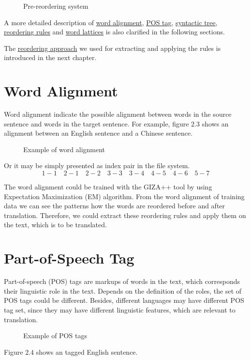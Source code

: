 \begin{figure}[H]
\centering

\caption{Pre-reordering system}
\end{figure}

A more detailed description of \hyperref[ch:Foundations:sec:Alignment]{word alignment}, \hyperref[ch:Foundations:sec:PosTag]{POS tag}, \hyperref[ch:Foundations:sec:SyntacticTree]{syntactic tree},
\hyperref[ch:Foundations:sec:types]{reordering rules} and 
\hyperref[ch:Foundations:sec:Lattices]{word lattices} is also clarified in the following sections.

The \hyperref[ch:ReorderingApproach]{reordering approach} we used for extracting and applying the rules is introduced in the next chapter.

\section{Word Alignment}
\label{ch:Foundations:sec:Alignment}

Word alignment indicate the possible alignment between words in the source sentence and words in the target sentence. For example, figure $2.3$ shows an alignment between an English sentence and a Chinese sentence.

\begin{figure}[H]
\centering

\caption{Example of word alignment}
\end{figure}

Or it may be simply presented as index pair in the file system.
$$1-1\quad 2-1\quad 2-2\quad 3-3\quad 3-4\quad 4-5\quad 4-6\quad 5-7$$

The word alignment could be trained with the GIZA++ tool by using Expectation Maximization (EM) algorithm. From the word alignment of training data we can see the patterns how the words are reordered before and after translation. Therefore, we could extract these reordering rules and apply them on the text, which is to be translated.

\section{Part-of-Speech Tag}

Part-of-speech (POS) tags are markups of words in the text, which corresponds their linguistic role in the text. Depends on the definition of the roles, the set of POS tags could be different. Besides, different languages may have different POS tag set, since they may have different linguistic features, which are relevant to translation.
\begin{figure}[H]
\centering

\caption{Example of POS tags}
\end{figure}
Figure $2.4$ shows an tagged English sentence. 

